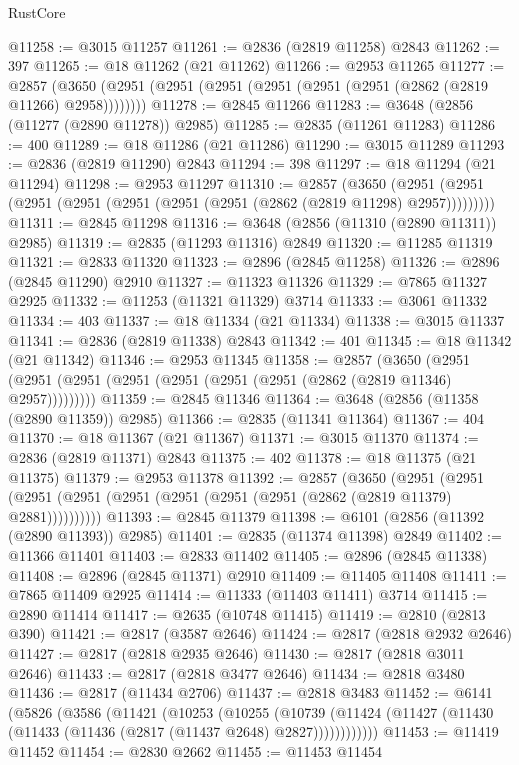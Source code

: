 \begin{lexlean}{RustCore}
\begin{coremodule}
@11258 := @3015 @11257
@11261 := @2836 (@2819 @11258) @2843
@11262 := 397
@11265 := @18 @11262 (@21 @11262)
@11266 := @2953 @11265
@11277 := @2857 (@3650 (@2951 (@2951 (@2951 (@2951 (@2951 (@2951 (@2862 (@2819 @11266) @2958))))))))
@11278 := @2845 @11266
@11283 := @3648 (@2856 (@11277 (@2890 @11278)) @2985)
@11285 := @2835 (@11261 @11283)
@11286 := 400
@11289 := @18 @11286 (@21 @11286)
@11290 := @3015 @11289
@11293 := @2836 (@2819 @11290) @2843
@11294 := 398
@11297 := @18 @11294 (@21 @11294)
@11298 := @2953 @11297
@11310 := @2857
    (@3650 (@2951 (@2951 (@2951 (@2951 (@2951 (@2951 (@2951 (@2862 (@2819 @11298) @2957)))))))))
@11311 := @2845 @11298
@11316 := @3648 (@2856 (@11310 (@2890 @11311)) @2985)
@11319 := @2835 (@11293 @11316) @2849
@11320 := @11285 @11319
@11321 := @2833 @11320
@11323 := @2896 (@2845 @11258)
@11326 := @2896 (@2845 @11290) @2910
@11327 := @11323 @11326
@11329 := @7865 @11327 @2925
@11332 := @11253 (@11321 @11329) @3714
@11333 := @3061 @11332
@11334 := 403
@11337 := @18 @11334 (@21 @11334)
@11338 := @3015 @11337
@11341 := @2836 (@2819 @11338) @2843
@11342 := 401
@11345 := @18 @11342 (@21 @11342)
@11346 := @2953 @11345
@11358 := @2857
    (@3650 (@2951 (@2951 (@2951 (@2951 (@2951 (@2951 (@2951 (@2862 (@2819 @11346) @2957)))))))))
@11359 := @2845 @11346
@11364 := @3648 (@2856 (@11358 (@2890 @11359)) @2985)
@11366 := @2835 (@11341 @11364)
@11367 := 404
@11370 := @18 @11367 (@21 @11367)
@11371 := @3015 @11370
@11374 := @2836 (@2819 @11371) @2843
@11375 := 402
@11378 := @18 @11375 (@21 @11375)
@11379 := @2953 @11378
@11392 := @2857
    (@3650
      (@2951 (@2951 (@2951 (@2951 (@2951 (@2951 (@2951 (@2951 (@2862 (@2819 @11379) @2881))))))))))
@11393 := @2845 @11379
@11398 := @6101 (@2856 (@11392 (@2890 @11393)) @2985)
@11401 := @2835 (@11374 @11398) @2849
@11402 := @11366 @11401
@11403 := @2833 @11402
@11405 := @2896 (@2845 @11338)
@11408 := @2896 (@2845 @11371) @2910
@11409 := @11405 @11408
@11411 := @7865 @11409 @2925
@11414 := @11333 (@11403 @11411) @3714
@11415 := @2890 @11414
@11417 := @2635 (@10748 @11415)
@11419 := @2810 (@2813 @390)
@11421 := @2817 (@3587 @2646)
@11424 := @2817 (@2818 @2932 @2646)
@11427 := @2817 (@2818 @2935 @2646)
@11430 := @2817 (@2818 @3011 @2646)
@11433 := @2817 (@2818 @3477 @2646)
@11434 := @2818 @3480
@11436 := @2817 (@11434 @2706)
@11437 := @2818 @3483
@11452 := @6141
    (@5826
      (@3586
        (@11421
          (@10253
            (@10255
              (@10739
                (@11424 (@11427 (@11430 (@11433 (@11436 (@2817 (@11437 @2648) @2827))))))))))))
@11453 := @11419 @11452
@11454 := @2830 @2662
@11455 := @11453 @11454

\end{coremodule}
\end{lexlean}
